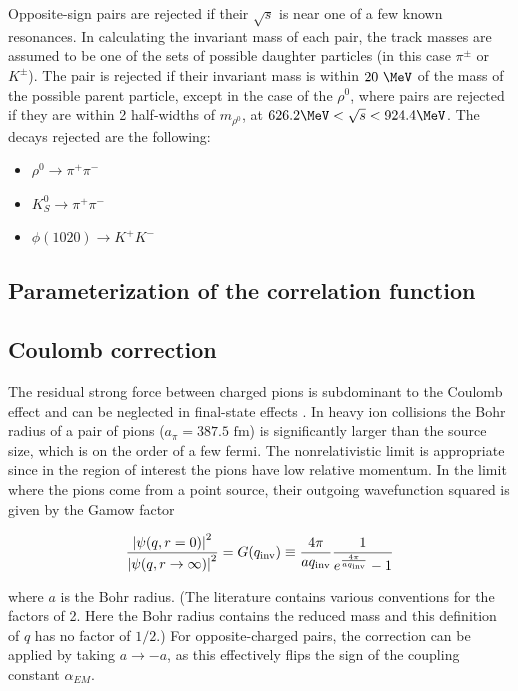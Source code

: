 Opposite-sign pairs are rejected if their $\sqrt{s}$ is near one of a few known resonances.
In calculating the invariant mass of each pair, the track masses are assumed to be one of the sets of possible daughter particles (in this case $\pi^{\pm}$ or $K^{\pm}$).
The pair is rejected if their invariant mass is within $20~\MeV$ of the mass of the possible parent particle, except in the case of the $\rho^{0}$, where pairs are rejected if they are within 2 half-widths of $m_{\rho^{0}}$, at $626.2 \MeV < \sqrt{s} < 924.4 \MeV$.
The decays rejected are the following:
\begin{itemize}
\item
  $\rho^{0} \rightarrow \pi^{+} \pi^{-}$
\item
  $K^{0}_{S} \rightarrow \pi^{+} \pi^{-}$
\item
  $\phi(1020) \rightarrow K^{+} K^{-}$
\end{itemize}


\subsection{Parameterization of the correlation function}

\subsection{Coulomb correction}
\label{subsec:coulomb}
The residual strong force between charged pions is subdominant to the Coulomb effect and can be neglected in final-state effects \cite{Lednicky:2005tb}.
In heavy ion collisions the Bohr radius of a pair of pions ($a_{\pi} = 387.5 \textrm{ fm}$) is significantly larger than the source size, which is on the order of a few fermi.
The nonrelativistic limit is appropriate since in the region of interest the pions have low relative momentum.
In the limit where the pions come from a point source, their outgoing wavefunction squared is given by the Gamow factor

\begin{equation} \frac{\left| \psi (q, r=0) \right|^2}{\left| \psi (q, r\rightarrow\infty) \right|^2} = G(q_{\mathrm{inv}}) \equiv \frac{4\pi}{a q_{\mathrm{inv}}}\frac{1}{e^{\frac{4\pi}{a q_{\mathrm{inv}}}} - 1} \end{equation}

where $a$ is the Bohr radius.
(The literature contains various conventions for the factors of 2.
Here the Bohr radius contains the reduced mass and this definition of $q$ has no factor of $1/2$.)
For opposite-charged pairs, the correction can be applied by taking $a \to -a$, as this effectively flips the sign of the coupling constant $\alpha_{EM}$.

